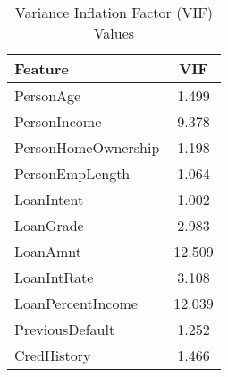 \begin{table}[H]\centering
\caption{Variance Inflation Factor (VIF) Values}
\label{Table 4:vif_values}
\begin{tabular}{lc}
\toprule
Feature & VIF \\
\midrule
PersonAge & 1.499 \\
PersonIncome & 9.378 \\
PersonHomeOwnership & 1.198 \\
PersonEmpLength & 1.064 \\
LoanIntent & 1.002 \\
LoanGrade & 2.983 \\
LoanAmnt & 12.509 \\
LoanIntRate & 3.108 \\
LoanPercentIncome & 12.039 \\
PreviousDefault & 1.252 \\
CredHistory & 1.466 \\
\bottomrule
\end{tabular}
\end{table}
